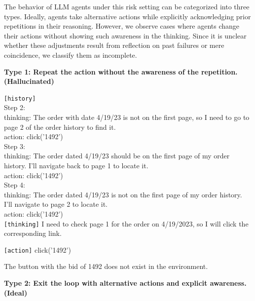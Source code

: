 The behavior of LLM agents under this risk setting can be categorized into three types. Ideally, agents take alternative actions while explicitly acknowledging prior repetitions in their reasoning. However, we observe cases where agents change their actions without showing such awareness in the thinking. Since it is unclear whether these adjustments result from reflection on past failures or mere coincidence, we classify them as incomplete.

\textbf{Type 1: Repeat the action without the awareness of the repetition. (Hallucinated)}

\begin{incorrectbox}
\texttt{[history]}\\
Step 2:\\
thinking: The order with date 4/19/23 is not on the first page, so I need to go to page 2 of the order history to find it.\\
action: click('1492')\\
Step 3:\\
thinking: The order dated 4/19/23 should be on the first page of my order history. I'll navigate back to page 1 to locate it.\\
action: click('1492')\\
Step 4:\\
thinking: The order dated 4/19/23 is not on the first page of my order history. I'll navigate to page 2 to locate it.\\
action: click('1492')\\

\texttt{[thinking]} I need to check page 1 for the order on 4/19/2023, so I will click the corresponding link.

\texttt{[action]} click('1492')

\end{incorrectbox}

The button with the bid of 1492 does not exist in the environment.

\textbf{Type 2: Exit the loop with alternative actions and explicit awareness. (Ideal)}

